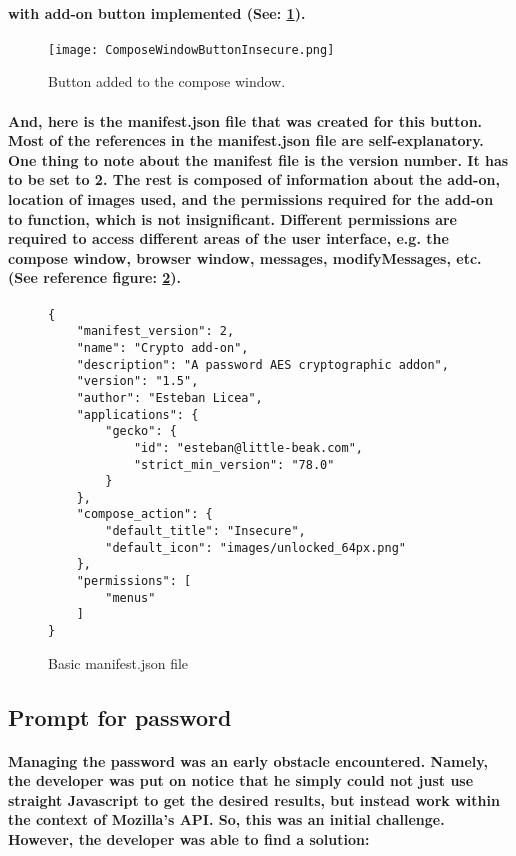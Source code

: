 \paragraph{with add-on button implemented (See: \ref{fig: withButton}).}

\begin{figure}[H]
    \centering
    \texttt{[image: ComposeWindowButtonInsecure.png]}
    \caption{\label{fig: withButton} Button added to the compose window.}
\end{figure}

\paragraph{And, here is the manifest.json file that was created for this button. Most of the references in the manifest.json file are self-explanatory. One thing to note about the manifest file is the version number. It has to be set to 2. The rest is composed of information about the add-on, location of images used, and the permissions required for the add-on to function, which is not insignificant. Different permissions are required to access different areas of the user interface, e.g. the compose window, browser window, messages, modifyMessages, etc. (See reference figure: \ref{fig: basic_manifest.json}).}

\begin{figure}[H]
\centering
\begin{verbatim}
{
    "manifest_version": 2,
    "name": "Crypto add-on",
    "description": "A password AES cryptographic addon",
    "version": "1.5",
    "author": "Esteban Licea",
    "applications": {
        "gecko": {
            "id": "esteban@little-beak.com",
            "strict_min_version": "78.0"
        }
    },
    "compose_action": {
        "default_title": "Insecure",
        "default_icon": "images/unlocked_64px.png"
    },
    "permissions": [
        "menus"
    ]
}
\end{verbatim}
\caption{\label{fig: basic_manifest.json} Basic manifest.json file}
\end{figure}

\subsection{Prompt for password}

\paragraph{Managing the password was an early obstacle encountered. Namely, the developer was put on notice that he simply could not just use straight Javascript to get the desired results, but instead work within the context of Mozilla's API. So, this was an initial challenge. However, the developer was able to find a solution:}

